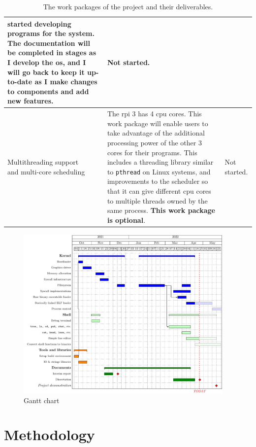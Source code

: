 \documentclass{article}
\begin{document}
\begin{table}[tbp]
\begin{center}
\begin{tabularx}{\textwidth}{|p{}|X|p{}|}
    started developing programs for the system. The documentation will be
    completed in stages as I develop the \gls{os}, and I will go back
    to keep it up-to-date as I make changes to components and add new
    features. &
    Not started.
    \\ \hline
    \makecell[lt]{Multithreading support \\ and multi-core scheduling} &
    The \gls{rpi} 3 has 4 \gls{cpu} cores. This work package will enable users
    to take advantage of the additional processing power of the other 3 cores
    for their programs. This includes a threading library similar to
    \texttt{pthread} on Linux systems, and improvements to the scheduler so
    that it can give different \gls{cpu} cores to multiple threads owned by the
    same process. \textbf{This work package is optional}. &
    Not started.
    \\ \hline
\end{tabularx}
\caption{The work packages of the project and their deliverables.}
\label{tab:work-packages}
\end{center}
\end{table}

\begin{figure}[htbp]
    \includegraphics[width=0.95\textwidth]{build/gantt.pdf}
    \caption{Gantt chart}
    \label{fig:gantt-chart}
\end{figure}


\section{Methodology}
\end{document}
